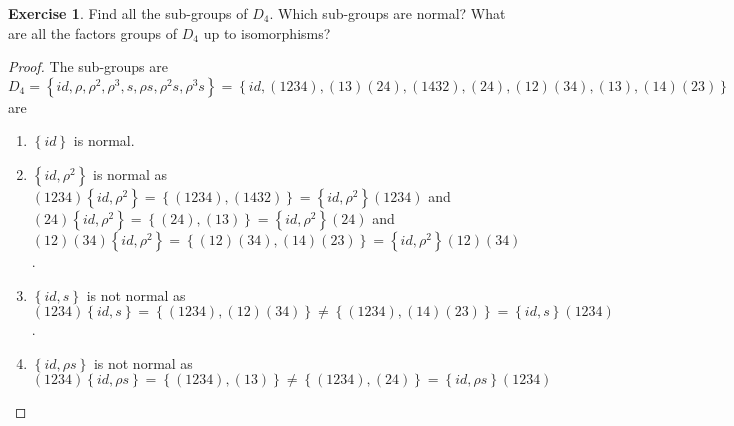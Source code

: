 \documentclass{article}
\theoremstyle{definition}
\newtheorem{theorem}{Exercise}[section]
\begin{document}
	
	\setcounter{section}{10}
	\setcounter{theorem}{1}
	\begin{theorem}
		Find all the sub-groups of $D_4$. Which sub-groups are normal? What are all the factors groups of $D_4$ up to isomorphisms?
	\end{theorem}
	\begin{proof}
		The sub-groups are $D_4 = \left\{ id, \rho, \rho^2, \rho^3, s, \rho s, \rho^2 s, \rho^3 s \right\} = \left\{ id, (1234), (13)(24), (1432), (24), (12)(34), (13), (14)(23) \right\}$ are \nolinebreak[4]
		\begin{enumerate}
			\setcounter{enumi}{0}
			\item $\left\{ id \right\}$ is normal.
				
			\item $\left\{id, \rho^2\right\}$ is normal as $(1234)\left\{id, \rho^2\right\} = \left\{(1234),(1432)\right\} = \left\{id, \rho^2\right\}(1234)$ and $(24)\left\{id, \rho^2\right\} = \left\{(24), (13)\right\} = \left\{id, \rho^2\right\}(24)$ and $(12)(34)\left\{id, \rho^2\right\} = \left\{ (12)(34), (14)(23)\right\} = \left\{id, \rho^2\right\}(12)(34)$. \checkmark
				
			\item $\left\{id, s\right\}$ is not normal as $ (1234)\left\{id, s \right\} = \left\{(1234),(12)(34)\right\} \not= \left\{(1234),(14)(23)\right\} = \left\{id, s\right\}(1234)$.
				
			\item $\left\{id, \rho s\right\}$ is not normal as $(1234)\left\{id, \rho s\right\} = \left\{ (1234), (13) \right\} \not= \left\{ (1234), (24) \right\} = \left\{id, \rho s\right\}(1234)$
				

\end{enumerate}
\end{proof}
\end{document}
